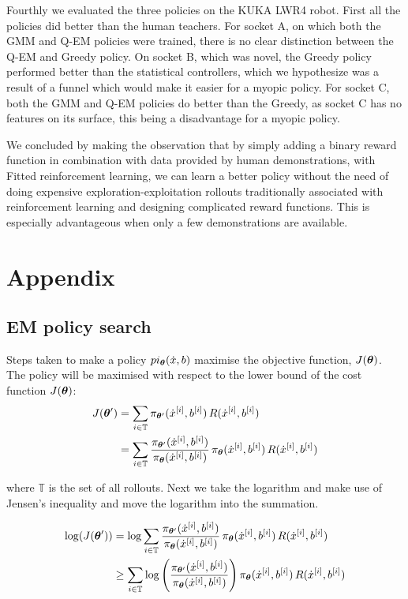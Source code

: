 Fourthly we evaluated the three policies on the KUKA LWR4 robot. First all the policies did better than the human 
teachers. For socket A, on which both the GMM and Q-EM policies were trained, there is no clear distinction between 
the Q-EM and Greedy policy. On socket B, which was novel, the Greedy policy performed better than the statistical controllers, 
which we hypothesize was a result of a funnel which would make it easier for a myopic policy. For socket C, both the 
GMM and Q-EM policies do better than the Greedy, as socket C has no features on its surface, this being a disadvantage 
for a myopic policy.

We concluded by making the observation that by simply adding a binary reward function in combination with 
data provided by human demonstrations, with Fitted reinforcement learning, we can learn a better policy without 
the need of doing expensive exploration-exploitation  rollouts traditionally associated with reinforcement learning and 
designing complicated reward functions. This is especially advantageous when only a few demonstrations are available.

\section{Appendix}
\subsection{EM policy search}\label{app:lb}
Steps taken to make a policy $pi_{\boldsymbol{\theta}}(\dot{x},b)$ maximise the objective function, $J(\boldsymbol{\theta})$.
The policy will be maximised with respect to the lower bound of the cost function $J(\boldsymbol{\theta})$:
\begin{align}
  J(\boldsymbol{\theta}') &= \sum_{i \in \mathbb{T}} \pi_{\boldsymbol{\theta}'}(\dot{x}^{[i]},b^{[i]})\, R(\dot{x}^{[i]},b^{[i]}) \nonumber\\ 
	   &= \sum_{i \in \mathbb{T}}  \frac{\pi_{\boldsymbol{\theta}'}(\dot{x}^{[i]},b^{[i]})}{\pi_{\boldsymbol{\theta}}(\dot{x}^{[i]},b^{[i]})} \, \pi_{\boldsymbol{\theta}}(\dot{x}^{[i]},b^{[i]}) \, R(\dot{x}^{[i]},b^{[i]})
\end{align}

where $\mathbb{T}$ is the set of all rollouts. Next we take the logarithm and make use of Jensen's inequality and move the logarithm into the 
summation.

\begin{align}
  \log( J(\boldsymbol{\theta}') )  &= \log \sum_{i \in \mathbb{T}} \frac{\pi_{\boldsymbol{\theta}'}(\dot{x}^{[i]},b^{[i]})}{\pi_{\boldsymbol{\theta}}(\dot{x}^{[i]},b^{[i]})} \, \pi_{\boldsymbol{\theta}}(\dot{x}^{[i]},b^{[i]}) \, R(\dot{x}^{[i]},b^{[i]}) \nonumber \\
		     & \geq \sum_{i \in \mathbb{T}}\log\Bigg( \frac{\pi_{\boldsymbol{\theta}'}(\dot{x}^{[i]},b^{[i]})}{\pi_{\boldsymbol{\theta}}(\dot{x}^{[i]},b^{[i]})}\Bigg) \, \pi_{\boldsymbol{\theta}}(\dot{x}^{[i]},b^{[i]}) \, R(\dot{x}^{[i]},b^{[i]}) \label{eq:lower_bound}
\end{align}

